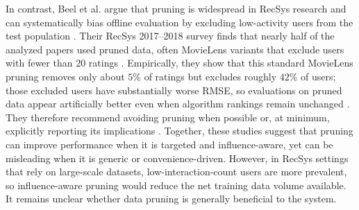 \documentclass[12pt,a4paper]{article}
\begin{document}
In contrast, Beel et al. argue that pruning is widespread in RecSys research and can systematically bias offline evaluation by excluding low-activity users from the test population \cite{beel2019}. Their RecSys 2017--2018 survey finds that nearly half of the analyzed papers used pruned data, often MovieLens variants that exclude users with fewer than $20$ ratings \cite{beel2019}. Empirically, they show that this standard MovieLens pruning removes only about $5\%$ of ratings but excludes roughly $42\%$ of users; those excluded users have substantially worse RMSE, so evaluations on pruned data appear artificially better even when algorithm rankings remain unchanged \cite{beel2019}. They therefore recommend avoiding pruning when possible or, at minimum, explicitly reporting its implications \cite{beel2019}. Together, these studies suggest that pruning can improve performance when it is targeted and influence-aware, yet can be misleading when it is generic or convenience-driven. However, in RecSys settings that rely on large-scale datasets, low-interaction-count users are more prevalent, so influence-aware pruning would reduce the net training data volume available. It remains unclear whether data pruning is generally beneficial to the system.
\end{document}

